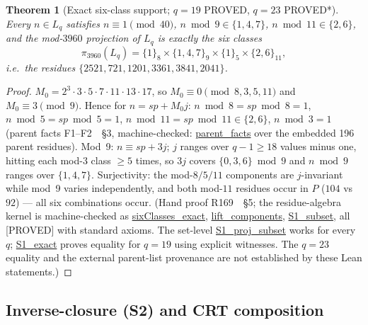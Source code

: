 \documentclass[11pt,a4paper]{article}
\newtheorem{theorem}{Theorem}
\theoremstyle{definition}
\begin{document}
\begin{theorem}[Exact six-class support; $q=19$ PROVED, $q=23$ PROVED*]
  \label{thm:s1}
  Every $n\in L_q$ satisfies $n\equiv1\pmod{40}$, $n\bmod9\in\{1,4,7\}$,
  $n\bmod11\in\{2,6\}$, and the mod-$3960$ projection of $L_q$ is
  \emph{exactly} the six classes
  \begin{equation}
    \label{eq:sixclasses}
    \pi_{3960}(L_q)=\{1\}_8\times\{1,4,7\}_9\times\{1\}_5\times\{2,6\}_{11},
  \end{equation}
  i.e.\ the residues
  $\{2521,721,1201,3361,3841,2041\}$.
\end{theorem}
\begin{proof}
$M_0=2^3\cdot3\cdot5\cdot7\cdot11\cdot13\cdot17$, so
$M_0\equiv0\pmod{8,3,5,11}$ and $M_0\equiv3\pmod9$. Hence for
$n=sp+M_0j$: $n\bmod8=sp\bmod8=1$,
$n\bmod5=sp\bmod5=1$, $n\bmod11=sp\bmod11\in\{2,6\}$,
$n\bmod3=1$ (parent facts F1--F2~\cite{R169}~\S3, machine-checked:
\url{parent_facts} over the embedded 196 parent residues).
Mod~9: $n\equiv sp+3j$; $j$ ranges over $q-1\ge18$ values minus one,
hitting each mod-$3$ class $\ge5$ times, so $3j$ covers $\{0,3,6\}\bmod9$
and $n\bmod9$ ranges over $\{1,4,7\}$. Surjectivity: the
mod-$8/5/11$ components are $j$-invariant while mod~9 varies
independently, and both mod-$11$ residues occur in $P$ ($104$ vs $92$)
--- all six combinations occur. (Hand proof R169~\cite{R169}~\S5;
the residue-algebra kernel is machine-checked as
\url{sixClasses_exact}, \url{lift_components},
\url{S1_subset}, all [PROVED] with standard axioms. The set-level
\url{S1_proj_subset} works for every $q$; \url{S1_exact} proves equality
for $q=19$ using explicit witnesses. The $q=23$ equality and the
external parent-list provenance are not established by these Lean
statements.)
\end{proof}

\subsection{Inverse-closure (S2) and CRT composition}
\end{document}
